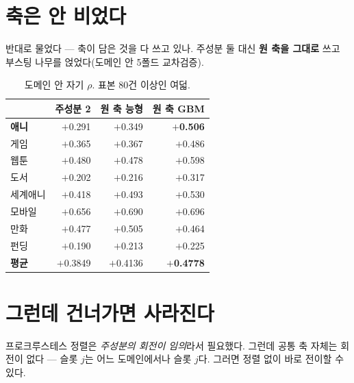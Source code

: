 \documentclass[10pt]{article}
\begin{document}

\section{축은 안 비었다}

반대로 물었다 --- 축이 담은 것을 다 쓰고 있나. 주성분 둘 대신 \textbf{원 축을
그대로} 쓰고 부스팅 나무를 얹었다(도메인 안 5폴드 교차검증).

\begin{table}[t]
\centering\tsize
\caption{도메인 안 자기 $\rho$. 표본 80건 이상인 여덟.}
\begin{tabular}{lrrr}
\toprule
& 주성분 2 & 원 축 능형 & \textbf{원 축 GBM} \\
\midrule
\textbf{애니} & $+$0.291 & $+$0.349 & \textbf{$+$0.506} \\
게임 & $+$0.365 & $+$0.367 & $+$0.486 \\
웹툰 & $+$0.480 & $+$0.478 & $+$0.598 \\
도서 & $+$0.202 & $+$0.216 & $+$0.317 \\
세계애니 & $+$0.418 & $+$0.493 & $+$0.530 \\
모바일 & $+$0.656 & $+$0.690 & $+$0.696 \\
만화 & $+$0.477 & $+$0.505 & $+$0.464 \\
펀딩 & $+$0.190 & $+$0.213 & $+$0.225 \\
\midrule
\textbf{평균} & $+$0.3849 & $+$0.4136 & \textbf{$+$0.4778} \\
\bottomrule
\end{tabular}
\end{table}


\section{그런데 건너가면 사라진다}

프로크루스테스 정렬은 \emph{주성분의 회전이 임의}라서 필요했다. 그런데 공통 축
자체는 회전이 없다 --- 슬롯 $j$는 어느 도메인에서나 슬롯 $j$다. 그러면 정렬
없이 바로 전이할 수 있다.
\end{document}

